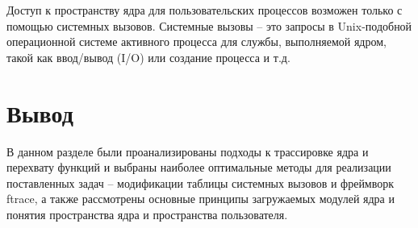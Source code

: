 	Доступ к пространству ядра для пользовательских процессов возможен только с помощью системных вызовов.
	Системные вызовы -- это запросы в Unix-подобной операционной системе активного процесса для службы,
	выполняемой ядром, такой как ввод/вывод (I/O) или создание процесса и т.д.

\section{Вывод}
	В данном разделе были проанализированы подходы к трассировке ядра и перехвату функций и 
	выбраны наиболее оптимальные методы для реализации поставленных задач -- модификации таблицы
	системных вызовов и фреймворк ftrace, 
	а также рассмотрены основные принципы загружаемых модулей ядра и понятия пространства ядра и пространства пользователя.
	
\pagebreak